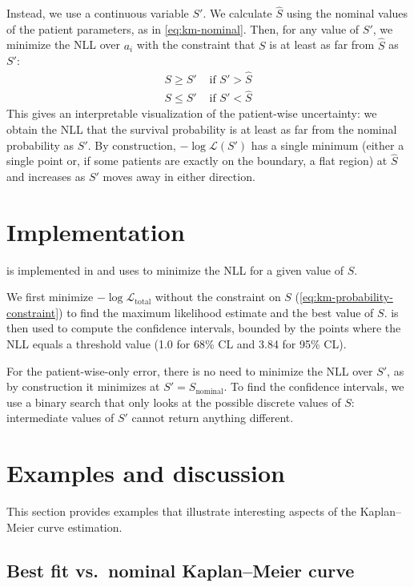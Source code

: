 \documentclass[article]{jss}
\newcommand{\KM}{Kaplan--Meier} %
\begin{document}
Instead, we use a continuous variable \(S'\).  We calculate \(\hat{S}\) using the nominal values of the patient parameters, as in \cref{eq:km-nominal}.  Then, for any value of \(S'\), we minimize the NLL over \(a_i\) with the constraint that \(S\) is at least as far from \(\hat{S}\) as \(S'\):
\begin{align}
S \ge S' & \text{ if } S' > \hat{S} \\
S \le S' & \text{ if } S' < \hat{S}
\end{align}
This gives an interpretable visualization of the patient-wise uncertainty: we obtain the NLL that the survival probability is at least as far from the nominal probability as \(S'\).  By construction, \(-\log\mathcal{L}(S')\) has a single minimum (either a single point or, if some patients are exactly on the boundary, a flat region) at \(\hat{S}\) and increases as \(S'\) moves away in either direction.

\section{Implementation}

 is implemented in  and uses  \citep{gurobi} to minimize the NLL for a given value of \(S\).

We first minimize \(-\log \mathcal{L}_{\text{total}}\) without the constraint on \(S\) (\ref{eq:km-probability-constraint}) to find the maximum likelihood estimate and the best value of \(S\)\@.   \citep{brentq,scipy} is then used to compute the confidence intervals, bounded by the points where the NLL equals a threshold value (1.0 for 68\% CL and 3.84 for 95\% CL).

For the patient-wise-only error, there is no need to minimize the NLL over \(S'\), as by construction it minimizes at \(S'=S_\text{nominal}\).  To find the confidence intervals, we use a binary search that only looks at the possible discrete values of \(S\): intermediate values of \(S'\) cannot return anything different.

\section{Examples and discussion}

This section provides examples that illustrate interesting aspects of the \KM{} curve estimation.

\subsection%
[Best fit vs. nominal \KM{} curve]%
{Best fit vs.\ nominal \KM{} curve}
\end{document}
